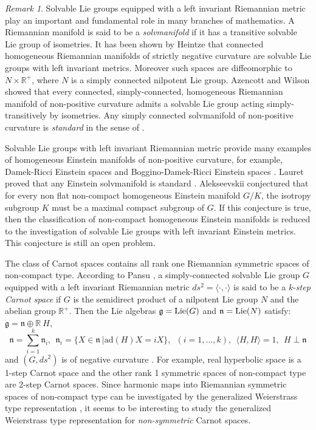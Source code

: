 \documentclass[12pt]{amsart}
\theoremstyle{definition}
\theoremstyle{remark}
\newtheorem{Remark}[Theorem]{Remark}
\numberwithin{equation}{section}
\begin{document}
\begin{Remark}
 Solvable Lie groups equipped with a
 left invariant Riemannian metric 
 play an important and fundamental role in many branches of mathematics. 
 A Riemannian manifold is said to be a \textit{solvmanifold} if it has a 
 transitive solvable Lie group of isometries. 
 It has been shown by Heintze \cite{Heintze} that 
 connected homogeneous Riemannian manifolds
 of strictly negative curvature are solvable Lie groups with left invariant metrics.
 Moreover such spaces are diffeomorphic to $N\times \mathbb{R}^{+}$,
 where $N$ is a simply connected nilpotent Lie group.
 Azencott and Wilson \cite{AW} showed that every connected, 
 simply-connected, homogeneous Riemannian manifold of non-positive curvature admits a 
 solvable Lie group acting simply-transitively by isometries. 
 Any simply connected solvmanifold of non-positive curvature is 
\textit{standard} in the sense of 
\cite{AW}. 

 Solvable Lie groups with 
 left invariant Riemannian metric provide many examples of homogeneous 
 Einstein manifolds of non-positive curvature, for example,
 Damek-Ricci Einstein spaces and 
 Boggino-Damek-Ricci Einstein spaces \cite{BTV, Heber}. 
 Lauret proved that any Einstein solvmanifold is standard \cite{Lauret}. 
 Alekseevskii \cite{Alek} conjectured that for every 
 non flat non-compact homogeneous Einstein manifold $G/K$, 
 the isotropy subgroup $K$ must be a maximal compact subgroup of 
 $G$.
 If this conjecture is true, then the classification of non-compact 
 homogeneous Einstein manifolds is reduced to the 
 investigation of solvable Lie groups with left invariant Einstein metrics. 
 This conjecture is still an open problem.

 The class of Carnot spaces contains all rank one 
 Riemannian symmetric spaces of non-compact type. 
 According to Pansu \cite{Pansu}, a
 simply-connected solvable Lie group $G$ equipped with a left 
 invariant Riemannian metric 
 $ds^2=\langle\cdot,\cdot\rangle$ is said to be a 
 $k$-\textit{step Carnot space} if $G$ is the semidirect product of a 
 nilpotent Lie group $N$ and the abelian group $\mathbb{R}^{+}$.
 Then the Lie algebras $\mathfrak{g} = {\rm Lie} (G)$ 
 and $\mathfrak{n} = {\rm Lie}(N)$ satisfy:
 $\mathfrak{g}= \mathfrak{n}\oplus\mathbb{R}\>H$,
\begin{equation*}
\mathfrak{n}=\sum_{i=1}^{k}\mathfrak{n}_{i}, 
\ \
\mathfrak{n}_{i}= 
\{X\in\mathfrak{n}\ | \mathrm{ad}(H)X=i X\},\
\; (i=1,\dots ,k),\ \ 
\langle H,H\rangle=1,\ \ H\perp \mathfrak{n}
\end{equation*}
and $(G,ds^2)$ is of negative curvature \cite{Pansu}. 
 For example, 
 real hyperbolic space is a 1-step Carnot 
 space and the other rank 1 symmetric spaces of non-compact type 
 are 2-step Carnot spaces. Since harmonic maps into Riemannian symmetric spaces of
 non-compact type can be investigated 
 by the generalized Weierstrass type representation 
 \cite{DPW}, 
 it seems to be interesting to study the generalized 
 Weierstrass type representation for \textit{non-symmetric} Carnot spaces.
\end{Remark}
\end{document}
